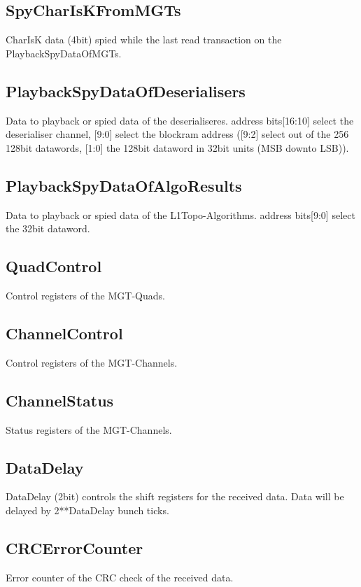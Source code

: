 \subsection{SpyCharIsKFromMGTs}
CharIsK data (4bit) spied while the last read transaction on the PlaybackSpyDataOfMGTs.

\subsection{PlaybackSpyDataOfDeserialisers}
Data to playback or spied data of the deserialiseres. address bits[16:10] select the deserialiser channel, [9:0] select the blockram address ([9:2] select out of the 256 128bit datawords, [1:0] the 128bit dataword in 32bit units (MSB downto LSB)).

\subsection{PlaybackSpyDataOfAlgoResults}
Data to playback or spied data of the L1Topo-Algorithms. address bits[9:0] select the 32bit dataword.

\subsection{QuadControl}
Control registers of the MGT-Quads.

\subsection{ChannelControl}
Control registers of the MGT-Channels.

\subsection{ChannelStatus}
Status registers of the MGT-Channels.

\subsection{DataDelay}
DataDelay (2bit) controls the shift registers for the received data. Data will be delayed by 2**DataDelay bunch ticks.

\subsection{CRCErrorCounter}
Error counter of the CRC check of the received data.

